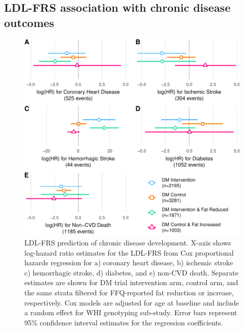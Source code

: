 \documentclass[]{article}
\begin{document}
\hypertarget{ldl-frs-association-with-chronic-disease-outcomes}{%
\subsection{LDL-FRS association with chronic disease
outcomes}\label{ldl-frs-association-with-chronic-disease-outcomes}}

\begin{figure}
\centering
\includegraphics{figures/outcomes-1.pdf}
\caption{LDL-FRS prediction of chronic disease development. X-axis shows
log-hazard ratio estimates for the LDL-FRS from Cox proportional hazards
regression for a) coronary heart disease, b) ischemic stroke c)
hemorrhagic stroke, d) diabetes, and e) non-CVD death. Separate
estimates are shown for DM trial intervention arm, control arm, and the
same strata filtered for FFQ-reported fat reduction or increase,
respectively. Cox models are adjusted for age at baseline and include a
random effect for WHI genotyping sub-study. Error bars represent 95\%
confidence interval estimates for the regression coefficients.}
\end{figure}
\end{document}
